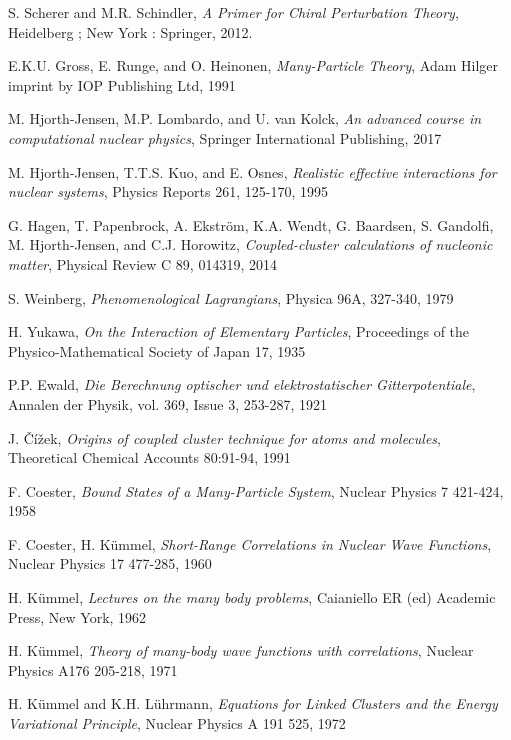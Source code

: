 \documentclass[10pt,twoside]{report}
\begin{document}
\begin{thebibliography}{9}
		S. Scherer and M.R. Schindler, \emph{A Primer for Chiral Perturbation Theory}, Heidelberg ; New York : Springer, 2012.
		
		E.K.U. Gross, E. Runge, and O. Heinonen, \emph{Many-Particle Theory}, Adam Hilger imprint by IOP Publishing Ltd, 1991
		
		M. Hjorth-Jensen, M.P. Lombardo, and U. van Kolck, \emph{An advanced course in computational nuclear physics}, Springer International Publishing, 2017
		
		M. Hjorth-Jensen, T.T.S. Kuo, and E. Osnes, \emph{Realistic effective interactions for nuclear systems}, Physics Reports 261, 125-170, 1995 
		
		G. Hagen, T. Papenbrock, A. Ekstr\"om, K.A. Wendt, G. Baardsen, S. Gandolfi, M. Hjorth-Jensen, and C.J. Horowitz, \emph{Coupled-cluster calculations of nucleonic matter}, Physical Review C 89, 014319, 2014
		
		S. Weinberg, \emph{Phenomenological Lagrangians}, Physica 96A, 327-340, 1979
		
		H. Yukawa, \emph{On the Interaction of Elementary Particles}, Proceedings of the Physico-Mathematical Society of Japan 17, 1935
		
		P.P. Ewald, \emph{Die Berechnung optischer und elektrostatischer Gitterpotentiale}, Annalen der Physik, vol. 369, Issue 3, 253-287, 1921
		
		J. \v{C}\'{i}\v{z}ek, \emph{Origins of coupled cluster technique for atoms and molecules}, Theoretical Chemical Accounts 80:91-94, 1991
		
		F. Coester, \emph{Bound States of a Many-Particle System}, Nuclear Physics 7 421-424, 1958
		
		F. Coester, H. K\"ummel, \emph{Short-Range Correlations in Nuclear Wave Functions}, Nuclear Physics 17 477-285, 1960
		
		H. K\"ummel, \emph{Lectures on the many body problems},  Caianiello ER (ed) Academic Press, New York, 1962
		
		H. K\"ummel, \emph{Theory of many-body wave functions with correlations}, Nuclear Physics A176 205-218, 1971
		
		H. K\"ummel and K.H. L\"uhrmann, \emph{Equations for Linked Clusters and the Energy Variational Principle}, Nuclear Physics A 191 525, 1972
		

\end{thebibliography}
\end{document}
